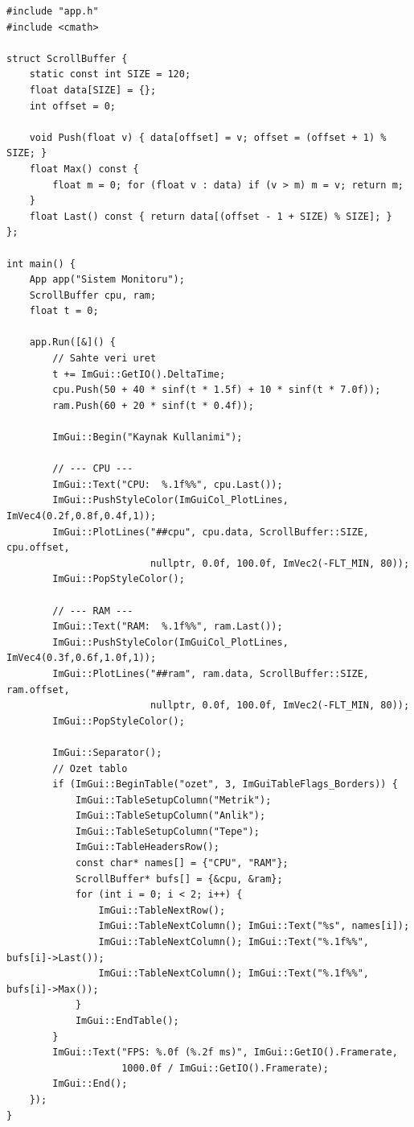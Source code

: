 \documentclass[11pt,a4paper]{article}
\begin{document}
\begin{lstlisting}
#include "app.h"
#include <cmath>

struct ScrollBuffer {
    static const int SIZE = 120;
    float data[SIZE] = {};
    int offset = 0;

    void Push(float v) { data[offset] = v; offset = (offset + 1) % SIZE; }
    float Max() const {
        float m = 0; for (float v : data) if (v > m) m = v; return m;
    }
    float Last() const { return data[(offset - 1 + SIZE) % SIZE]; }
};

int main() {
    App app("Sistem Monitoru");
    ScrollBuffer cpu, ram;
    float t = 0;

    app.Run([&]() {
        // Sahte veri uret
        t += ImGui::GetIO().DeltaTime;
        cpu.Push(50 + 40 * sinf(t * 1.5f) + 10 * sinf(t * 7.0f));
        ram.Push(60 + 20 * sinf(t * 0.4f));

        ImGui::Begin("Kaynak Kullanimi");

        // --- CPU ---
        ImGui::Text("CPU:  %.1f%%", cpu.Last());
        ImGui::PushStyleColor(ImGuiCol_PlotLines, ImVec4(0.2f,0.8f,0.4f,1));
        ImGui::PlotLines("##cpu", cpu.data, ScrollBuffer::SIZE, cpu.offset,
                         nullptr, 0.0f, 100.0f, ImVec2(-FLT_MIN, 80));
        ImGui::PopStyleColor();

        // --- RAM ---
        ImGui::Text("RAM:  %.1f%%", ram.Last());
        ImGui::PushStyleColor(ImGuiCol_PlotLines, ImVec4(0.3f,0.6f,1.0f,1));
        ImGui::PlotLines("##ram", ram.data, ScrollBuffer::SIZE, ram.offset,
                         nullptr, 0.0f, 100.0f, ImVec2(-FLT_MIN, 80));
        ImGui::PopStyleColor();

        ImGui::Separator();
        // Ozet tablo
        if (ImGui::BeginTable("ozet", 3, ImGuiTableFlags_Borders)) {
            ImGui::TableSetupColumn("Metrik");
            ImGui::TableSetupColumn("Anlik");
            ImGui::TableSetupColumn("Tepe");
            ImGui::TableHeadersRow();
            const char* names[] = {"CPU", "RAM"};
            ScrollBuffer* bufs[] = {&cpu, &ram};
            for (int i = 0; i < 2; i++) {
                ImGui::TableNextRow();
                ImGui::TableNextColumn(); ImGui::Text("%s", names[i]);
                ImGui::TableNextColumn(); ImGui::Text("%.1f%%", bufs[i]->Last());
                ImGui::TableNextColumn(); ImGui::Text("%.1f%%", bufs[i]->Max());
            }
            ImGui::EndTable();
        }
        ImGui::Text("FPS: %.0f (%.2f ms)", ImGui::GetIO().Framerate,
                    1000.0f / ImGui::GetIO().Framerate);
        ImGui::End();
    });
}
\end{lstlisting}
\end{document}
